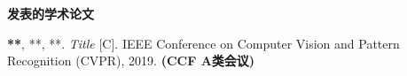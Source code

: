 \begin{publications}{2} %
\item [] \centerline{\large{\textbf{发表的学术论文}}}
    \item \textbf{**}, **, **.
    \textit{Title} [C].
    IEEE Conference on Computer Vision and Pattern Recognition (CVPR), 2019. 
    \textbf{(CCF A类会议)}

\end{publications}